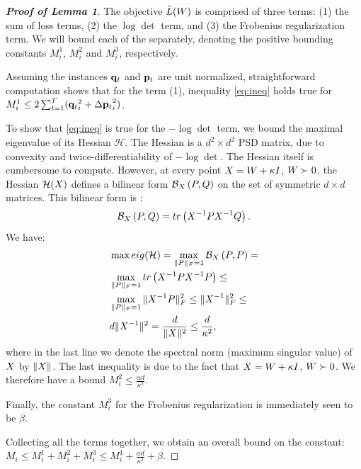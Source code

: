 \documentclass{article}
\begin{document}
\begin{proof}[\bf{Proof of Lemma 1}]

The objective $\tilde{L}({W})$ is comprised of three terms: (1) the sum of loss terms, (2) the $\log \det$ term, and (3) the Frobenius regularization term. We will bound each of the separately, denoting the positive bounding constants $M^1_i$, $M^2_i$ and $M^3_i$, respectively.  

Assuming the instances ${{\mathbf{q}}_{{t}}}$ and ${{\mathbf{p}}_{{t}}}$ are unit normalized, straightforward computation shows that for the term (1), inequality \ref{eq:ineq} holds true for $M^1_i \leq 2 \sum_{t=1}^T ({{\mathbf{q}}_{{t}}}_i^2 +{\Delta\mathbf{p}_{t}}_i^2)$. %

To show that \ref{eq:ineq} is true for the $- \log \det$ term, we bound the maximal eigenvalue of its Hessian $\mathcal{H}$. 
The Hessian is a $d^2 \times d^2$ PSD matrix, due to convexity and twice-differentiability of $- \log \det$. The Hessian itself is cumbersome to compute.
However, at every point ${X} = {W} + \kappa I$, ${W} \succ 0$, the Hessian $\mathcal{H}({X})$ defines a bilinear form $\mathcal{B}_{{X}}\left({P},{Q}\right)$ on the set of symmetric $d \times d$ matrices. This bilinear form is \citep[Appendix A.4.3]{boyd2004convex}: $$\mathcal{B}_{{X}}\left({P},{Q}\right) = tr\left({X}^{-1}{P} {X}^{-1}{Q}\right).$$  We have:
\begin{align*}
&\max eig(\mathcal{H}) = \max_{\|{P}\|_F=1} \mathcal{B}_{{X}}\left({P},{P}\right) = \\
&\max_{\|{P}\|_F=1} tr\left({X}^{-1}{P} {X}^{-1}{P}\right) \leq \\
&\max_{\|{P}\|_F=1} \|{X}^{-1} {P}\|_F^2 \leq \|{X}^{-1}\|_F^2 \leq  \\
& d \|{X}^{-1}\|^2 = \frac{d}{\|{X}\|^2} \leq \frac{d}{\kappa^2},
\end{align*}
where in the last line we denote the spectral norm (maximum singular value) of ${X}$ by $\|{X}\|$. The last inequality is due to the fact that ${X} = {W} + \kappa I$, ${W} \succ 0$.
We therefore have a bound $M^2_i \leq \frac{\alpha d}{\kappa^2}$.

Finally, the constant $M^3_{i}$ for the Frobenius regularization is immediately seen to be $\beta$.

Collecting all the terms together, we obtain an overall bound on the constant: $M_i \leq M^1_{i} + M^2_{i} + M^3_{i} \leq  M^1_{i} + \frac{\alpha d}{\kappa ^2} + \beta$.

\end{proof}
\end{document}
